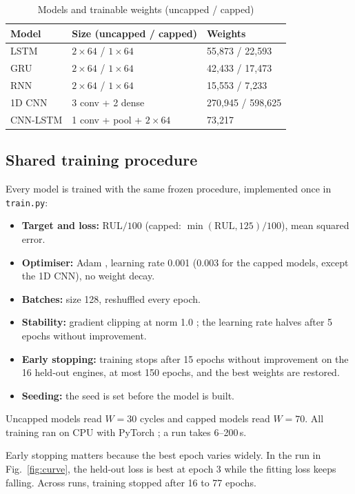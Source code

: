 \documentclass[conference]{IEEEtran}
\begin{document}
\begin{table}[t]
\centering
\caption{Models and trainable weights (uncapped / capped)}
\label{tab:models}
\setlength{\tabcolsep}{4pt}
\begin{tabular}{@{}lll@{}}
\toprule
Model & Size (uncapped / capped) & Weights \\
\midrule
LSTM & $2\times64$ / $1\times64$ & 55{,}873 / 22{,}593 \\
GRU & $2\times64$ / $1\times64$ & 42{,}433 / 17{,}473 \\
RNN & $2\times64$ / $1\times64$ & 15{,}553 / 7{,}233 \\
1D CNN & 3 conv + 2 dense & 270{,}945 / 598{,}625 \\
CNN-LSTM & 1 conv + pool + $2\times64$ & 73{,}217 \\
\bottomrule
\end{tabular}
\end{table}

\subsection{Shared training procedure}
Every model is trained with the same frozen procedure, implemented once in \texttt{train.py}:
\begin{itemize}
  \item \textbf{Target and loss:} RUL$/100$ (capped: $\min(\mathrm{RUL},125)/100$), mean squared error.
  \item \textbf{Optimiser:} Adam \cite{kingma2015adam}, learning rate 0.001 (0.003 for the capped models, except the 1D CNN), no weight decay.
  \item \textbf{Batches:} size 128, reshuffled every epoch.
  \item \textbf{Stability:} gradient clipping at norm 1.0 \cite{pascanu2013difficulty}; the learning rate halves after 5 epochs without improvement.
  \item \textbf{Early stopping:} training stops after 15 epochs without improvement on the 16 held-out engines, at most 150 epochs, and the best weights are restored.
  \item \textbf{Seeding:} the seed is set before the model is built.
\end{itemize}
Uncapped models read $W=30$ cycles and capped models read $W=70$. All training ran on CPU with PyTorch \cite{paszke2019pytorch}; a run takes 6--200\,s.

Early stopping matters because the best epoch varies widely. In the run in Fig.~\ref{fig:curve}, the held-out loss is best at epoch 3 while the fitting loss keeps falling. Across runs, training stopped after 16 to 77 epochs.
\end{document}
